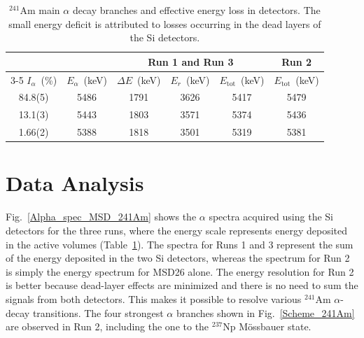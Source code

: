 \documentclass[aps,UTF8,prc,twocolumn,preprintnumbers,amsmath,amssymb,floatfix]{revtex4-2}
\begin{document}
\begin{table}[htbp!]\footnotesize
\caption{\label{Energy_loss} $^{241}$Am main $\alpha$ decay branches and effective energy loss in detectors. The small energy deficit is attributed to losses occurring in the dead layers of the Si detectors.}
\begin{center}
\renewcommand{\arraystretch}{1.1}  %
\begin{ruledtabular}
\begin{tabular}{cccccc}
  &  & \multicolumn{3}{|c|}{Run 1 and Run 3} & \multicolumn{1}{c}{Run 2}  \\
  \cline{3-5}\cline{6-6}
  $I_\alpha$~(\%)\footnotemark[1] & $E_\alpha$~(keV)\footnotemark[1] & \multicolumn{1}{|c}{$\Delta E$~(keV)} & $E_r$~(keV) & \multicolumn{1}{c|}{$E_{\mathrm{tot}}$~(keV)} & $E_{\mathrm{tot}}$~(keV) \\
  \hline
84.8(5) & 5486 & 1791 & 3626 & 5417 & 5479 \\
13.1(3) & 5443 & 1803 & 3571 & 5374 & 5436 \\
1.66(2) & 5388 & 1818 & 3501 & 5319 & 5381 \\
\end{tabular}
\end{ruledtabular}
\end{center}
\end{table}

\section{Data Analysis}

Fig.~\ref{Alpha_spec_MSD_241Am} shows the $\alpha$ spectra acquired using the Si detectors for the three runs, where the energy scale represents energy deposited in the active volumes (Table~\ref{Energy_loss}). The spectra for Runs 1 and 3 represent the sum of the energy deposited in the two Si detectors, whereas the spectrum for Run 2 is simply the energy spectrum for MSD26 alone. The energy resolution for Run 2 is better because dead-layer effects are minimized and there is no need to sum the signals from both detectors. This makes it possible to resolve various $^{241}$Am $\alpha$-decay transitions. The four strongest $\alpha$ branches shown in Fig.~\ref{Scheme_241Am} are observed in Run 2, including the one to the $^{237}$Np M\"{o}ssbauer state. 
\end{document}
